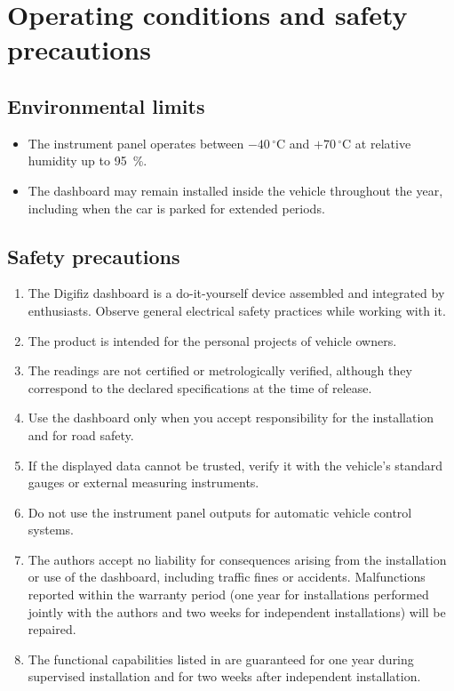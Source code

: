 \chapter{Operating conditions and safety precautions}\label{ch:safety}

\section{Environmental limits}
\begin{itemize}
    \item The instrument panel operates between \(-40\,^{\circ}\mathrm{C}\) and \(+70\,^{\circ}\mathrm{C}\) at relative humidity up to 95~\%.
    \item The dashboard may remain installed inside the vehicle throughout the year, including when the car is parked for extended periods.
\end{itemize}

\section{Safety precautions}
\begin{enumerate}
    \item The Digifiz dashboard is a do-it-yourself device assembled and integrated by enthusiasts. Observe general electrical safety practices while working with it.
    \item The product is intended for the personal projects of vehicle owners.
    \item The readings are not certified or metrologically verified, although they correspond to the declared specifications at the time of release.
    \item Use the dashboard only when you accept responsibility for the installation and for road safety.
    \item If the displayed data cannot be trusted, verify it with the vehicle's standard gauges or external measuring instruments.
    \item Do not use the instrument panel outputs for automatic vehicle control systems.
    \item The authors accept no liability for consequences arising from the installation or use of the dashboard, including traffic fines or accidents. Malfunctions reported within the warranty period (one year for installations performed jointly with the authors and two weeks for independent installations) will be repaired.
    \item The functional capabilities listed in  are guaranteed for one year during supervised installation and for two weeks after independent installation.
\end{enumerate}
